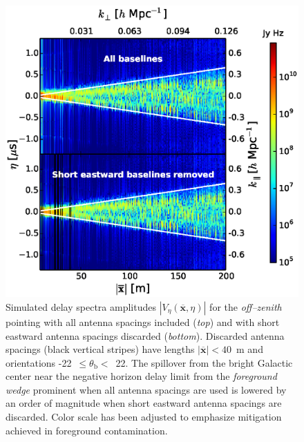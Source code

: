 \documentclass[preprint2,iop,numberedappendix]{emulateapj}
\begin{document}
\begin{figure}[htb]
\centering
\includegraphics[width=\linewidth]{figures/v1_0/baseline_screening_before_after_nside_64_Tsys_95.0K.eps}
\caption{Simulated delay spectra amplitudes $|V_\eta(\overline{\mathbf{x}},\eta)|$ for the {\it off--zenith} pointing with all antenna spacings included ({\it top}) and with short eastward antenna spacings discarded ({\it bottom}). Discarded antenna spacings (black vertical stripes) have lengths $|\overline{\mathbf{x}}| < 40$~m and orientations -22~$\le\theta_\textrm{b}<$~22. The spillover from the bright Galactic center near the negative horizon delay limit from the {\it foreground wedge} prominent when all antenna spacings are used is lowered by an order of magnitude when short eastward antenna spacings are discarded. Color scale has been adjusted to emphasize mitigation achieved in foreground contamination. \label{fig:before-after}}
\end{figure}
\end{document}
